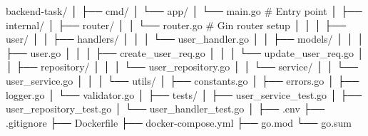backend-task/
│
├── cmd/
│   └── app/
│       └── main.go          # Entry point
│
├── internal/
│   ├── router/
│   │   └── router.go        # Gin router setup
│   │
│   ├── user/
│   │   ├── handlers/
│   │   │   └── user_handler.go
│   │   ├── models/
│   │   │   ├── user.go
│   │   │   ├── create_user_req.go
│   │   │   └── update_user_req.go
│   │   ├── repository/
│   │   │   └── user_repository.go
│   │   └── service/
│   │       └── user_service.go
│   │
│   └── utils/
│       ├── constants.go
│       ├── errors.go
│       ├── logger.go
│       └── validator.go
│
├── tests/
│   ├── user_service_test.go
│   ├── user_repository_test.go
│   └── user_handler_test.go
│
├── .env
├── .gitignore
├── Dockerfile
├── docker-compose.yml
├── go.mod
└── go.sum
